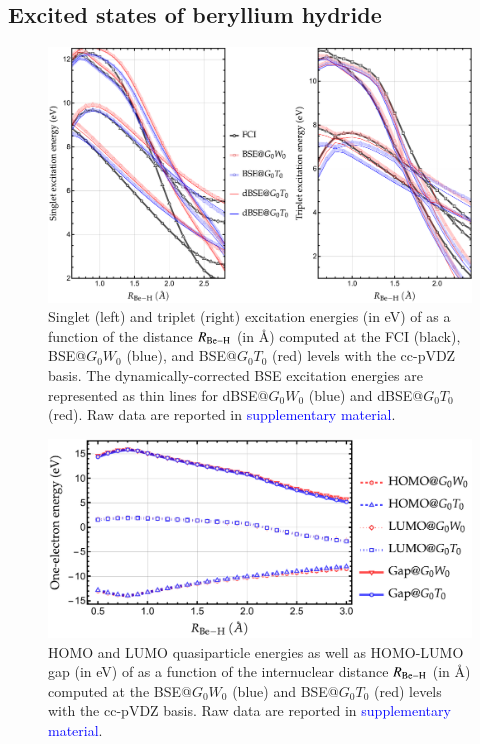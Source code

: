 \documentclass[aip,jcp,reprint,noshowkeys,superscriptaddress]{revtex4-1}
\newcommand{\SupMat}{\textcolor{blue}{supplementary material}}
\begin{document}
\subsection{Excited states of beryllium hydride}
\label{sec:beh2}

\begin{figure}[t]
	\includegraphics[width=\textwidth]{fig4}
	\caption{Singlet (left) and triplet (right) excitation energies (in \si{\eV}) of  as a function of the distance $R_{\ce{Be-H}}$ (in \si{\angstrom}) computed at the FCI (black), BSE@$G_0W_0$ (blue), and BSE@$G_0T_0$ (red) levels with the cc-pVDZ basis.
	The dynamically-corrected BSE excitation energies are represented as thin lines for dBSE@$G_0W_0$ (blue) and dBSE@$G_0T_0$ (red).
	Raw data are reported in {\SupMat}.}
	\label{fig:BeH2}
\end{figure}

\begin{figure}[t]
	\includegraphics[width=\linewidth]{fig5}
	\caption{HOMO and LUMO quasiparticle energies as well as HOMO-LUMO gap (in \si{\eV}) of  as a function of the internuclear distance $R_{\ce{Be-H}}$ (in \si{\angstrom}) computed at the BSE@$G_0W_0$ (blue) and BSE@$G_0T_0$ (red) levels with the cc-pVDZ basis.
	Raw data are reported in {\SupMat}.}
	\label{fig:BeH2_gap}
\end{figure}
\end{document}
